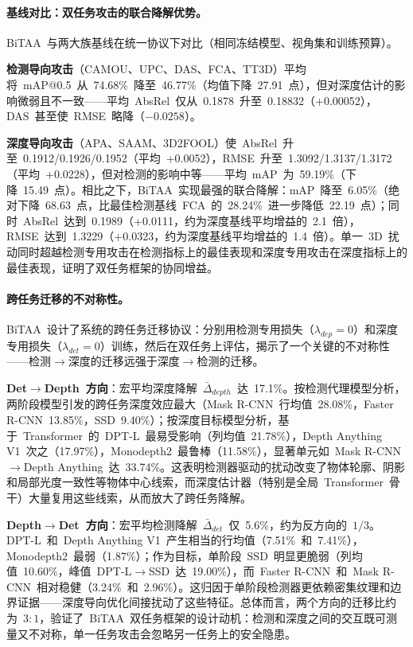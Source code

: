 \paragraph{基线对比：双任务攻击的联合降解优势。}
BiTAA~与两大族基线在统一协议下对比（相同冻结模型、视角集和训练预算）。

\textbf{检测导向攻击}（CAMOU、UPC、DAS、FCA、TT3D）平均将~mAP@0.5~从~74.68\%~降至~46.77\%（均值下降~27.91~点），但对深度估计的影响微弱且不一致——平均~AbsRel~仅从~0.1878~升至~0.18832（+0.00052），DAS~甚至使~RMSE~略降（$-0.0258$）。

\textbf{深度导向攻击}（APA、SAAM、3D2FOOL）使~AbsRel~升至~0.1912/0.1926/0.1952（平均~+0.0052），RMSE~升至~1.3092/1.3137/1.3172（平均~+0.0228），但对检测的影响中等——平均~mAP~为~59.19\%（下降~15.49~点）。相比之下，BiTAA~实现最强的联合降解：mAP~降至~6.05\%（绝对下降~68.63~点，比最佳检测基线~FCA~的~28.24\%~进一步降低~22.19~点）；同时~AbsRel~达到~0.1989（+0.0111，约为深度基线平均增益的~2.1~倍），RMSE~达到~1.3229（+0.0323，约为深度基线平均增益的~1.4~倍）。单一~3D~扰动同时超越检测专用攻击在检测指标上的最佳表现和深度专用攻击在深度指标上的最佳表现，证明了双任务框架的协同增益。

\paragraph{跨任务迁移的不对称性。}
BiTAA~设计了系统的跨任务迁移协议：分别用检测专用损失（$\lambda_{dep} = 0$）和深度专用损失（$\lambda_{det} = 0$）训练，然后在双任务上评估，揭示了一个关键的不对称性——检测$\to$深度的迁移远强于深度$\to$检测的迁移。

\textbf{Det$\to$Depth~方向}：宏平均深度降解~$\bar{\Delta}_{depth}$~达~17.1\%。按检测代理模型分析，两阶段模型引发的跨任务深度效应最大（Mask R-CNN~行均值~28.08\%，Faster R-CNN~13.85\%，SSD~9.40\%）；按深度目标模型分析，基于~Transformer~的~DPT-L~最易受影响（列均值~21.78\%），Depth Anything V1~次之（17.97\%），Monodepth2~最鲁棒（11.58\%），显著单元如~Mask R-CNN$\to$Depth Anything~达~33.74\%。这表明检测器驱动的扰动改变了物体轮廓、阴影和局部光度一致性等物体中心线索，而深度估计器（特别是全局~Transformer~骨干）大量复用这些线索，从而放大了跨任务降解。

\textbf{Depth$\to$Det~方向}：宏平均检测降解~$\bar{\Delta}_{det}$~仅~5.6\%，约为反方向的~$1/3$。DPT-L~和~Depth Anything V1~产生相当的行均值（7.51\%~和~7.41\%），Monodepth2~最弱（1.87\%）；作为目标，单阶段~SSD~明显更脆弱（列均值~10.60\%，峰值~DPT-L$\to$SSD~达~19.00\%），而~Faster R-CNN~和~Mask R-CNN~相对稳健（3.24\%~和~2.96\%）。这归因于单阶段检测器更依赖密集纹理和边界证据——深度导向优化间接扰动了这些特征。总体而言，两个方向的迁移比约为~$3:1$，验证了~BiTAA~双任务框架的设计动机：检测和深度之间的交互既可测量又不对称，单一任务攻击会忽略另一任务上的安全隐患。

